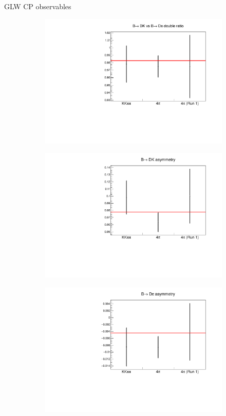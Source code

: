 \documentclass{beamer}
\begin{document}
\begin{frame}{GLW CP observables}
  \begin{figure}
    \centering
    \begin{subfigure}{0.45\textwidth}
      \includegraphics[width = 1.0\textwidth]{Plots/R_CP.pdf}
    \end{subfigure}
    \begin{subfigure}{0.45\textwidth}
      \includegraphics[width = 1.0\textwidth]{Plots/B2DK_Asymmetry.pdf}
    \end{subfigure}%
    \begin{subfigure}{0.45\textwidth}
      \includegraphics[width = 1.0\textwidth]{Plots/B2Dpi_Asymmetry.pdf}

\end{subfigure}
\end{figure}
\end{frame}
\end{document}
